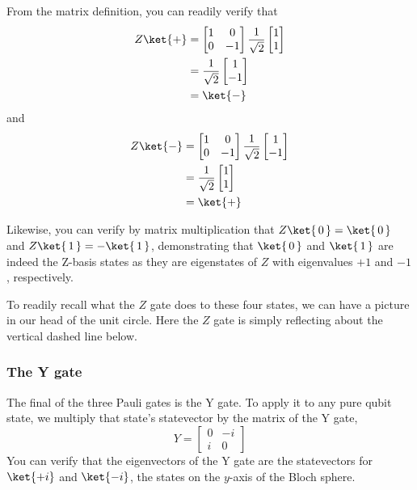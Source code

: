 \documentclass{article}
\theoremstyle{definition}
\newcommand{\kz}[1]{\ket{\,#1\,}}
\newcommand{\kx}[1]{\ket{#1}}
\begin{document}
From the matrix definition, you can readily verify that
\begin{align}
	Z \kx+ &= \begin{bmatrix}
		1 & 0\\
		0 & -1
	\end{bmatrix} \frac{1}{\sqrt{2}}\begin{bmatrix}
		1\\
		1
	\end{bmatrix}\\
	&= \frac{1}{\sqrt{2}}\begin{bmatrix}
		1\\
		-1
	\end{bmatrix}\\
	&= \kx-
\end{align}
and
\begin{align}
	Z \kx- &= \begin{bmatrix}
		1 & 0\\
		0 & -1
	\end{bmatrix} \frac{1}{\sqrt{2}}\begin{bmatrix}
		1\\
		-1
	\end{bmatrix}\\
	&= \frac{1}{\sqrt{2}}\begin{bmatrix}
		1\\
		1
	\end{bmatrix}\\
	&= \kx+
\end{align}

Likewise, you can verify by matrix multiplication that $Z \kz0 = \kz0$ and $Z \kz1 = -\kz1$, demonstrating that $\kz0$ and $\kz1$ are indeed the Z-basis states as they are eigenstates of $Z$ with eigenvalues $+1$ and $-1$, respectively.

To readily recall what the $Z$ gate does to these four states, we can have a picture in our head of the unit circle.
Here the $Z$ gate is simply reflecting about the vertical dashed line below.
\begin{figure}[H]
\end{figure}
\begin{figure}[H]
\end{figure}

\subsubsection{The Y gate}
The final of the three Pauli gates is the Y gate.
To apply it to any pure qubit state, we multiply that state's statevector by the matrix of the Y gate,
\begin{equation}
	Y = \begin{bmatrix}
		0 & -i\\
		i & 0
	\end{bmatrix}
\end{equation}
You can verify that the eigenvectors of the Y gate are the statevectors for $\ket{+i}$ and $\ket{-i}$, the states on the $y$-axis of the Bloch sphere.
\end{document}
